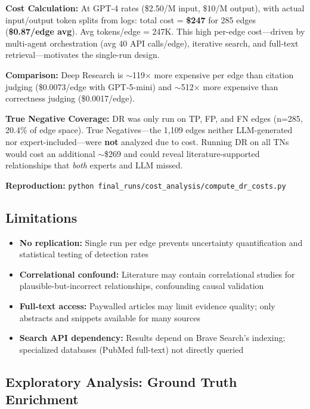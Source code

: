 \textbf{Cost Calculation:} At GPT-4 rates (\$2.50/M input, \$10/M output), with actual input/output token splits from logs: total cost = \textbf{\$247} for 285 edges (\textbf{\$0.87/edge avg}). Avg tokens/edge = 247K. This high per-edge cost---driven by multi-agent orchestration (avg 40 API calls/edge), iterative search, and full-text retrieval---motivates the single-run design.

\textbf{Comparison:} Deep Research is $\sim$119$\times$ more expensive per edge than citation judging (\$0.0073/edge with GPT-5-mini) and $\sim$512$\times$ more expensive than correctness judging (\$0.0017/edge).

\textbf{True Negative Coverage:} DR was only run on TP, FP, and FN edges (n=285, 20.4\% of edge space). True Negatives---the 1,109 edges neither LLM-generated nor expert-included---were \textbf{not} analyzed due to cost. Running DR on all TNs would cost an additional $\sim$\$269 and could reveal literature-supported relationships that \textit{both} experts and LLM missed.

\textbf{Reproduction:} \texttt{python final\_runs/cost\_analysis/compute\_dr\_costs.py}

\subsection{Limitations}

\begin{itemize}[noitemsep]
    \item \textbf{No replication:} Single run per edge prevents uncertainty quantification and statistical testing of detection rates
    \item \textbf{Correlational confound:} Literature may contain correlational studies for plausible-but-incorrect relationships, confounding causal validation
    \item \textbf{Full-text access:} Paywalled articles may limit evidence quality; only abstracts and snippets available for many sources
    \item \textbf{Search API dependency:} Results depend on Brave Search's indexing; specialized databases (PubMed full-text) not directly queried
\end{itemize}

\subsection{Exploratory Analysis: Ground Truth Enrichment}
\label{sec:gt_enrichment_method}

